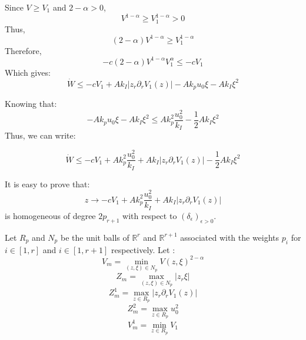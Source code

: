 Since \(V \geq V_1\) and \(2 - \alpha > 0\),
\begin{equation}
V^{1-\alpha} \geq V_1^{1-\alpha} > 0
\end{equation}
Thus,
\begin{equation}
(2-\alpha) V^{1-\alpha} \geq V_1^{1-\alpha}
\end{equation}
Therefore,
\begin{equation}
- c (2-\alpha) V^{1-\alpha} V_1^\alpha \leq -c V_1
\end{equation}
Which gives:
\begin{equation}
\dot{W} \leq -c V_1 + A k_I |z_r \partial_r V_1(z)| - A k_p u_0 \xi - A k_I \xi^2
\end{equation}

Knowing that:
\begin{equation}
- A k_p u_0 \xi - A k_I \xi^2 \leq A k_p^2 \frac{u_0^2}{k_I} - \frac{1}{2} A k_I \xi^2
\end{equation}
Thus, we can write:


\begin{equation}
\dot{W} \leq -c V_1 + A k_p^2 \frac{u_0^2}{k_I} + A k_I |z_r \partial_r V_1(z)| - \frac{1}{2} A k_I \xi^2
\end{equation}


It is easy to prove that:
\begin{equation}
z \rightarrow -c V_1 + A k_p^2 \frac{u_0^2}{k_I} + A k_I |z_r \partial_r V_1(z)| 
\end{equation}
is homogeneous of degree \(2 p_{r+1}\) with respect to \((\delta_{\epsilon})_{\epsilon > 0}\).


Let \(R_p\) and \(N_p\) be the unit balls of \(\mathbb{R}^r\) and \(\mathbb{R}^{r+1}\) associated with the weights \(p_i\) for \(i \in [1, r]\) and \(i \in [1, r+1]\) respectively.
Let :
\begin{equation}
V_m = \min_{(z, \xi) \in N_p} V(z, \xi)^{2-\alpha}
\end{equation}
\begin{equation}
Z_m = \max_{(z, \xi) \in N_p} |z_r \xi|
\end{equation}
\begin{equation}
Z_m^1 = \max_{z \in R_p} |z_r \partial_r V_1(z)|
\end{equation}
\begin{equation}
Z_m^2 = \max_{z \in R_p} u_0^2
\end{equation}
\begin{equation}
V_m^1 = \min_{z \in R_p} V_1
\end{equation}

